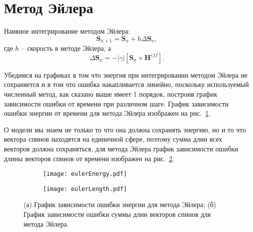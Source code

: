 \section{Метод Эйлера}\label{sec:sol-euler}
Наивное интегрирование методом Эйлера:
\begin{equation}
    \mathbf S_{n+1} = \mathbf S_{n} + h\Delta{\mathbf S_n},
\end{equation}
где $h$ -- скорость в методе Эйлера, а
\begin{equation}
    \Delta{\mathbf S_n} = -|\gamma|\left[\mathbf S_n \times 
    \mathbf H^{eff}\right].
\end{equation}

Убедимся на графиках в том что энергия при интегрировании методом Эйлера не
сохраняется и в том что ошибка накапливается линейно, поскольку используемый
численный метод, как сказано выше имеет 1 порядок, построив график зависимости
ошибки от времени при различном шаге. График зависимости ошибки энергии от
времени для метода Эйлера изображен на рис.~\ref{fig:eulerEnergy}.

О модели мы знаем не только то что она должна сохранять энергию, но и то что
вектора спинов находятся на единичной сфере, поэтому сумма длин всех векторов
должна сохраняться, для метода Эйлера график зависимости ошибки длины векторов
спинов от времени изображен на рис.~\ref{fig:eulerLength}.
\begin{figure}[H]
    \centering
    \begin{subfigure}[b]{0.49\textwidth}
        \centering
        \texttt{[image: eulerEnergy.pdf]}
        \caption{}
        \label{fig:eulerEnergy}
    \end{subfigure}
    \begin{subfigure}[b]{0.49\textwidth}
        \centering
        \texttt{[image: eulerLength.pdf]}
        \caption{}
        \label{fig:eulerLength}
    \end{subfigure}
    \caption{(а) График зависимости ошибки энергии для метода Эйлера;
        (б) График зависимости ошибки суммы длин векторов спинов для
        метода Эйлера.}
\label{fig:euler-errors}
\end{figure}


